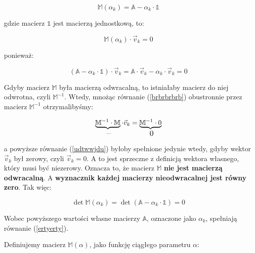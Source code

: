 	\begin{equation}
		\mathbb{M}(\alpha_k)= 
		\mathbb{A}-\alpha_k\cdot \mathbb{1}
		\label{yuyuyuyuyuy}
	\end{equation}
	
	\noindent gdzie macierz $\mathbb{1}$ jest macierzą jednostkową, to:
	
	\begin{equation}
		\mathbb{M}(\alpha_k)\cdot \vec{v}_k= 0
		\label{brbrbrbrb}
	\end{equation}
	
	\noindent ponieważ:
	
	\begin{equation}
		(\mathbb{A}-\alpha_k\cdot \mathbb{1})\cdot \vec{v}_k=\mathbb{A}\cdot \vec{v}_k -\alpha_k \cdot \vec{v}_k =  0
		\label{ioioioioi}
	\end{equation}
	
	\noindent Gdyby macierz $\mathbb{M}$ była macierzą odwracalną, to istniałaby macierz do niej odwrotna, czyli $\mathbb{M}^{-1}$. Wtedy, mnożąc równanie (\ref{brbrbrbrb}) obustronnie przez macierz $\mathbb{M}^{-1}$ otrzymalibyśmy:
	
	\begin{equation}
		\underbrace{
			\mathbb{M}^{-1}\cdot \mathbb{M}
		}_{\ \Resize{0.25cm}{\mathbb{1}}}
		\cdot \vec{v}_k =
		\underbrace{
			\mathbb{M}^{-1} \cdot 0
		}_{\ \Resize{0.2cm}{0}}
		\label{udtwwjdu}
	\end{equation}
	
	\noindent a powyższe równanie (\ref{udtwwjdu}) byłoby spełnione jedynie wtedy, gdyby wektor $\vec{v}_k$ był zerowy, czyli $\vec{v}_k =0$. A to jest sprzeczne z definicją wektora własnego, który musi być niezerowy. Oznacza to, że macierz $\mathbb{M}$ \textbf{nie jest macierzą odwracalną}. A \textbf{wyznacznik każdej macierzy nieodwracalnej jest równy zero}. Tak więc:
	
	\begin{equation}
		\det \mathbb{M}(\alpha_k)=
		\det
		(\mathbb{A}-\alpha_k \cdot \mathbb{1}) 
		= 0
		\label{ertyerty}
	\end{equation}
	
	\noindent Wobec powyższego wartości własne macierzy $\mathbb{A}$, oznaczone jako $\alpha_k$, spełniają równanie (\ref{ertyerty}).
	
	\newpage
	Definiujemy macierz $\mathbb{M}(\alpha)$, jako funkcję ciągłego parametru $\alpha$:
	
